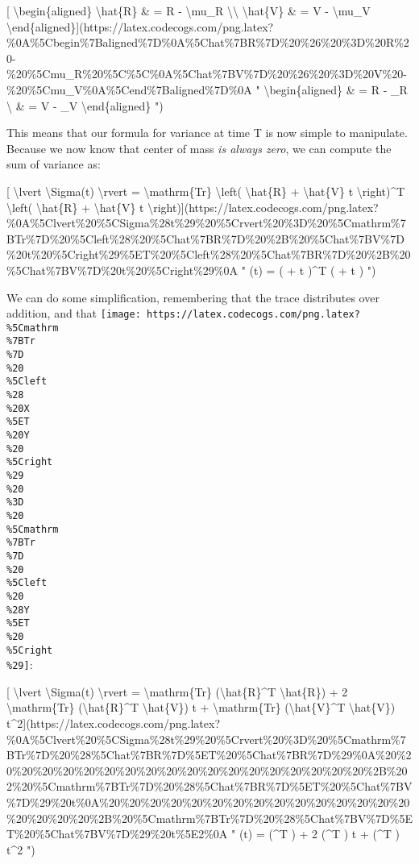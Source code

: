 \documentclass[]{article}
\begin{document}
{[} \textbackslash{}begin\{aligned\} \textbackslash{}hat\{R\} \& = R -
\textbackslash{}mu\_R \textbackslash{}\textbackslash{} \textbackslash{}hat\{V\}
\& = V - \textbackslash{}mu\_V
\textbackslash{}end\{aligned\}{]}(https://latex.codecogs.com/png.latex?\%0A\%5Cbegin\%7Baligned\%7D\%0A\%5Chat\%7BR\%7D\%20\%26\%20\%3D\%20R\%20-\%20\%5Cmu\_R\%20\%5C\%5C\%0A\%5Chat\%7BV\%7D\%20\%26\%20\%3D\%20V\%20-\%20\%5Cmu\_V\%0A\%5Cend\%7Baligned\%7D\%0A
" \textbackslash{}begin\{aligned\}  \& = R - \mu\_R \textbackslash{}
 \& = V - \mu\_V \textbackslash{}end\{aligned\} ")

This means that our formula for variance at time T is now simple to manipulate.
Because we now know that center of mass \emph{is always zero}, we can compute
the sum of variance as:

{[} \textbackslash{}lvert \textbackslash{}Sigma(t) \textbackslash{}rvert =
\textbackslash{}mathrm\{Tr\} \textbackslash{}left( \textbackslash{}hat\{R\} +
\textbackslash{}hat\{V\} t \textbackslash{}right)\^{}T \textbackslash{}left(
\textbackslash{}hat\{R\} + \textbackslash{}hat\{V\} t
\textbackslash{}right){]}(https://latex.codecogs.com/png.latex?\%0A\%5Clvert\%20\%5CSigma\%28t\%29\%20\%5Crvert\%20\%3D\%20\%5Cmathrm\%7BTr\%7D\%20\%5Cleft\%28\%20\%5Chat\%7BR\%7D\%20\%2B\%20\%5Chat\%7BV\%7D\%20t\%20\%5Cright\%29\%5ET\%20\%5Cleft\%28\%20\%5Chat\%7BR\%7D\%20\%2B\%20\%5Chat\%7BV\%7D\%20t\%20\%5Cright\%29\%0A
" \lvert \Sigma(t) \rvert =  \left(  +  t \right)\^{}T
\left(  +  t \right) ")

We can do some simplification, remembering that the trace distributes over
addition, and that
\texttt{[image: https://latex.codecogs.com/png.latex?\\\%5Cmathrm\\\%7BTr\\\%7D\\\%20\\\%5Cleft\\\%28\\\%20X\\\%5ET\\\%20Y\\\%20\\\%5Cright\\\%29\\\%20\\\%3D\\\%20\\\%5Cmathrm\\\%7BTr\\\%7D\\\%20\\\%5Cleft\\\%20\\\%28Y\\\%5ET\\\%20\\\%5Cright\\\%29]}:

{[} \textbackslash{}lvert \textbackslash{}Sigma(t) \textbackslash{}rvert =
\textbackslash{}mathrm\{Tr\} (\textbackslash{}hat\{R\}\^{}T
\textbackslash{}hat\{R\}) + 2 \textbackslash{}mathrm\{Tr\}
(\textbackslash{}hat\{R\}\^{}T \textbackslash{}hat\{V\}) t +
\textbackslash{}mathrm\{Tr\} (\textbackslash{}hat\{V\}\^{}T
\textbackslash{}hat\{V\})
t\^{}2{]}(https://latex.codecogs.com/png.latex?\%0A\%5Clvert\%20\%5CSigma\%28t\%29\%20\%5Crvert\%20\%3D\%20\%5Cmathrm\%7BTr\%7D\%20\%28\%5Chat\%7BR\%7D\%5ET\%20\%5Chat\%7BR\%7D\%29\%0A\%20\%20\%20\%20\%20\%20\%20\%20\%20\%20\%20\%20\%20\%20\%20\%20\%20\%20\%20\%2B\%202\%20\%5Cmathrm\%7BTr\%7D\%20\%28\%5Chat\%7BR\%7D\%5ET\%20\%5Chat\%7BV\%7D\%29\%20t\%0A\%20\%20\%20\%20\%20\%20\%20\%20\%20\%20\%20\%20\%20\%20\%20\%20\%20\%20\%20\%2B\%20\%5Cmathrm\%7BTr\%7D\%20\%28\%5Chat\%7BV\%7D\%5ET\%20\%5Chat\%7BV\%7D\%29\%20t\%5E2\%0A
" \lvert \Sigma(t) \rvert =  (\^{}T ) + 2 
(\^{}T ) t +  (\^{}T ) t\^{}2 ")
\end{document}
